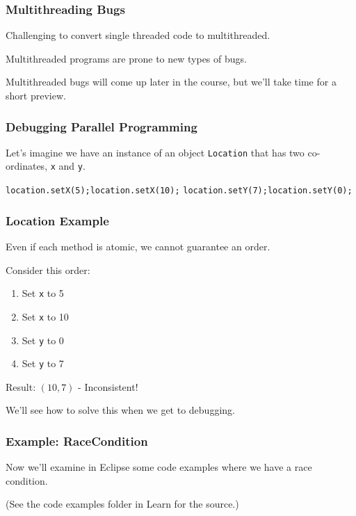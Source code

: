 \begin{frame}
\frametitle{Multithreading Bugs}
\begin{changemargin}{1cm}

Challenging to convert single threaded code to multithreaded. 

Multithreaded programs are prone to new types of bugs.

Multithreaded bugs will come up later in the course, but we'll take time for a short preview.

\end{changemargin}
\end{frame}

\begin{frame}
\frametitle{Debugging Parallel Programming}
\begin{changemargin}{1cm}

Let's imagine we have an instance of an object \texttt{Location} that has two co-ordinates, \texttt{x} and \texttt{y}. 


\texttt{location.setX(5);\quad\quad location.setX(10);}
\texttt{location.setY(7);\quad\quad location.setY(0);}

\end{changemargin}
\end{frame}

\begin{frame}
\frametitle{Location Example}
\begin{changemargin}{1cm}
Even if each method is atomic, we cannot guarantee an order.

Consider this order:
\begin{enumerate}
	\item Set \texttt{x} to 5
	\item Set \texttt{x} to 10
	\item Set \texttt{y} to 0
	\item Set \texttt{y} to 7
\end{enumerate} 

Result: $(10, 7)$ - Inconsistent! 

We'll see how to solve this when we get to debugging.

\end{changemargin}
\end{frame}


\begin{frame}
\frametitle{Example: RaceCondition} 
\begin{changemargin}{1cm}

Now we'll examine in Eclipse some code examples where we have a race condition. 

(See the code examples folder in Learn for the source.)


\end{changemargin}
\end{frame}




